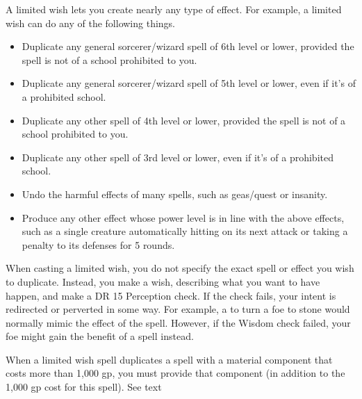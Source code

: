 \begin{spellheader}
\end{spellheader}
\begin{spellcontent}
    \begin{spelltargetinginfo}
    \end{spelltargetinginfo}
    \begin{spelleffects}
        \spelleffect A limited wish lets you create nearly any type of effect. For example, a limited wish can do any of the following things.
        \begin{itemize}
            \item Duplicate any general sorcerer/wizard spell of 6th level or lower, provided the spell is not of a school prohibited to you.
            \item Duplicate any general sorcerer/wizard spell of 5th level or lower, even if it's of a prohibited school.
            \item Duplicate any other spell of 4th level or lower, provided the spell is not of a school prohibited to you.
            \item Duplicate any other spell of 3rd level or lower, even if it's of a prohibited school.
            \item Undo the harmful effects of many spells, such as geas/quest or insanity.
            \item Produce any other effect whose power level is in line with the above effects, such as a single creature automatically hitting on its next attack or taking a  penalty to its defenses for 5 rounds.
        \end{itemize}
        \par When casting a limited wish, you do not specify the exact spell or effect you wish to duplicate. Instead, you make a wish, describing what you want to have happen, and make a DR 15 Perception check. If the check fails, your intent is redirected or perverted in some way. For example, a  to turn a foe to stone would normally mimic the  effect of the  spell. However, if the Wisdom check failed, your foe might gain the benefit of a  spell instead.
        \par When a limited wish spell duplicates a spell with a material component that costs more than 1,000 gp, you must provide that component (in addition to the 1,000 gp cost for this spell).
        \spelldur See text
    \end{spelleffects}
\end{spellcontent}
\begin{spellfooter}
\end{spellfooter}

